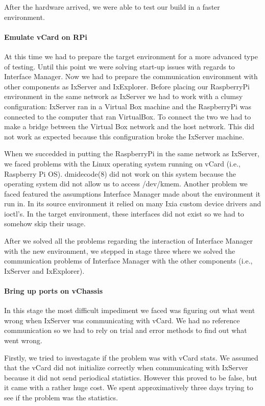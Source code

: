 After the hardware arrived, we were able to test our build in a faster
environment.

\paragraph{Emulate vCard on RPi}

At this time we had to prepare the target environment for a more advanced
type of testing. Until this point we were solving start-up issues with regards
to Interface Manager. Now we had to prepare the communication environment with
other components as IxServer and IxExplorer. Before placing our RaspberryPi
environment in the same network as IxServer we had to work with a clumsy
configuration: IxServer ran in a Virtual Box machine and the RaspberryPi was
connected to the computer that ran VirtualBox. To connect the two we had to make
a bridge between the Virtual Box network and the host network. This did not work
as expected because this configuration broke the IxServer machine.

When we succedded in putting the RaspberryPi in the same network as IxServer,
we faced problems with the Linux operating system running on vCard (i.e.,
Raspberry Pi OS). dmidecode(8) did not work on this system because the operating
system did not allow us to access /dev/kmem. Another problem we faced featured
the assumptions Interface Manager made about the environment it run in. In its
source environment it relied on many Ixia custom device drivers and ioctl's.
In the target environment, these interfaces did not exist so we had to somehow
skip their usage.

After we solved all the problems regarding the interaction of Interface Manager
with the new environment, we stepped in stage three where we solved the
communication problems of Interface Manager with the other components (i.e.,
IxServer and IxExplorer).

\paragraph{Bring up ports on vChassis}

In this stage the most difficult impediment we faced was figuring out what went
wrong when IxServer was communicating with vCard. We had no reference
communication so we had to rely on trial and error methods to find out what went
wrong.

Firstly, we tried to investagate if the problem was with vCard stats. We assumed
that the vCard did not initialize correctly when communicating with IxServer
because it did not send periodical statistics. However this proved to be false,
but it came with a rather huge cost. We spent approximatively three days trying
to see if the problem was the statistics.

